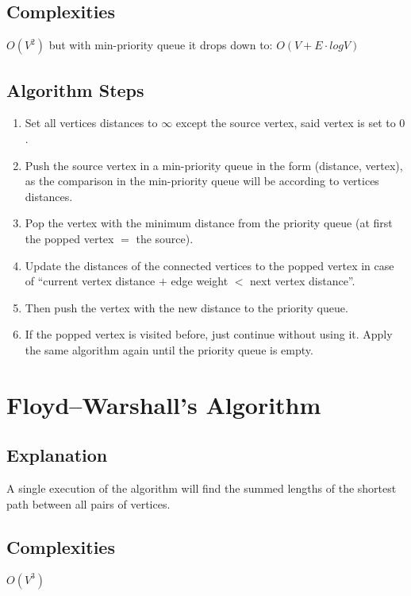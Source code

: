\documentclass[]{article}
\begin{document}
	\subsection{Complexities}
	\textit{$O(V^2)$} but with min-priority queue it drops down to: \textit{$O(V+E \cdot log V)$}
	\subsection{Algorithm Steps}
	\begin{enumerate}
		\item Set all vertices distances to $\infty$ except the source vertex, said vertex is set to $0$.
		\item Push the source vertex in a min-priority queue in the form (distance, vertex), as the comparison in the min-priority queue will be according to vertices distances.
		\item Pop the vertex with the minimum distance from the priority queue (at first the popped vertex $=$ the source).
		\item Update the distances of the connected vertices to the popped vertex in case of ``current vertex distance $+$ edge weight $<$ next vertex distance''. 
		\item Then push the vertex with the new distance to the priority queue.
		\item If the popped vertex is visited before, just continue without using it.
		Apply the same algorithm again until the priority queue is empty.
	\end{enumerate}

\section{Floyd–Warshall's Algorithm}
	\subsection{Explanation}
	\par A single execution of the algorithm will find the summed lengths of the shortest path between all pairs of vertices.
	
	\subsection{Complexities}
	\par \textit{$O(V^3)$}
	
\end{document}
